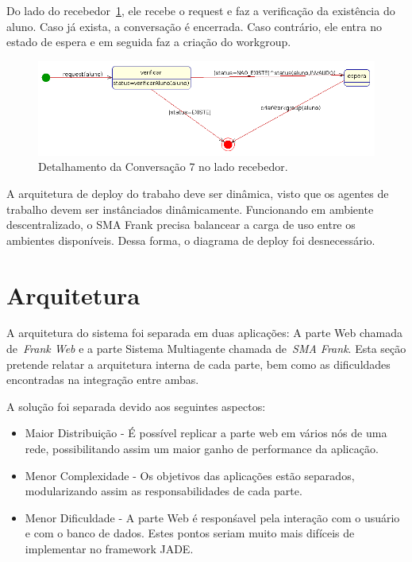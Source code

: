 Do lado do recebedor~\ref{fig:conv7-recebedor}, ele recebe o request e faz a verificação da existência do aluno. Caso já exista, a conversação é encerrada. Caso contrário, ele entra no estado de espera e em seguida faz a criação do workgroup.
\begin{figure}
	\centering
	\includegraphics[scale=0.48]{images/conv7-recebedor.png}
	\caption{Detalhamento da Conversação 7 no lado recebedor.}
	\label{fig:conv7-recebedor}
\end{figure}

A arquitetura de deploy do trabaho deve ser dinâmica, visto que os agentes de trabalho devem ser instânciados dinâmicamente. Funcionando em ambiente descentralizado, o SMA Frank precisa balancear a carga de uso entre os ambientes disponíveis. Dessa forma, o diagrama de deploy foi desnecessário.

\section{Arquitetura}

A arquitetura do sistema foi separada em duas aplicações: A parte Web chamada de~\emph{Frank Web} e a parte Sistema Multiagente chamada de~\emph{SMA Frank}. Esta seção pretende relatar a arquitetura interna de cada parte, bem como as dificuldades encontradas na integração entre ambas.

A solução foi separada devido aos seguintes aspectos:
\begin{itemize}
	\item Maior Distribuição - É possível replicar a parte web em vários nós de uma rede, possibilitando assim um maior ganho de performance da aplicação.
	\item Menor Complexidade - Os objetivos das aplicações estão separados, modularizando assim as responsabilidades de cada parte.
	\item Menor Dificuldade - A parte Web é responśavel pela interação com o usuário e com o banco de dados. Estes pontos seriam muito mais difíceis de implementar no framework JADE.
\end{itemize}

